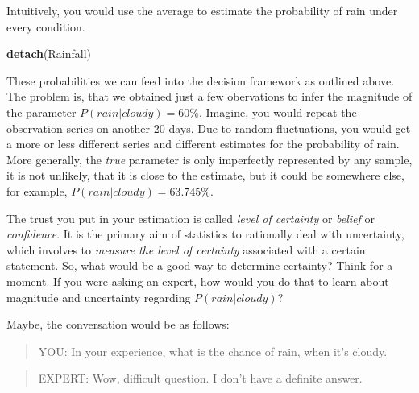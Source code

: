 \documentclass[]{svmono}
\newenvironment{Shaded}{\begin{snugshade}}{\end{snugshade}}
\newcommand{\KeywordTok}[1]{\textcolor[rgb]{0.13,0.29,0.53}{\textbf{#1}}}
\newcommand{\DataTypeTok}[1]{\textcolor[rgb]{0.13,0.29,0.53}{#1}}
\newcommand{\StringTok}[1]{\textcolor[rgb]{0.31,0.60,0.02}{#1}}
\newcommand{\OperatorTok}[1]{\textcolor[rgb]{0.81,0.36,0.00}{\textbf{#1}}}
\newcommand{\NormalTok}[1]{#1}
\theoremstyle{definition}
\theoremstyle{definition}
\theoremstyle{definition}
\theoremstyle{remark}
\begin{document}
Intuitively, you would use the average to estimate the probability of
rain under every condition.

\begin{Shaded}
\end{Shaded}

\begin{Shaded}
\begin{Highlighting}[]
\KeywordTok{detach}\NormalTok{(Rainfall)}
\end{Highlighting}
\end{Shaded}

These probabilities we can feed into the decision framework as outlined
above. The problem is, that we obtained just a few obervations to infer
the magnitude of the parameter \(P(rain|cloudy) = 60\)\%. Imagine, you
would repeat the observation series on another 20 days. Due to random
fluctuations, you would get a more or less different series and
different estimates for the probability of rain. More generally, the
\emph{true} parameter is only imperfectly represented by any sample, it
is not unlikely, that it is close to the estimate, but it could be
somewhere else, for example, \(P(rain|cloudy) = 63.745\)\%.

The trust you put in your estimation is called \emph{level of certainty}
or \emph{belief} or \emph{confidence}. It is the primary aim of
statistics to rationally deal with uncertainty, which involves to
\emph{measure the level of certainty} associated with a certain
statement. So, what would be a good way to determine certainty? Think
for a moment. If you were asking an expert, how would you do that to
learn about magnitude and uncertainty regarding \(P(rain|cloudy)\)?

Maybe, the conversation would be as follows:

\begin{quote}
YOU: In your experience, what is the chance of rain, when it's cloudy.
\end{quote}

\begin{quote}
EXPERT: Wow, difficult question. I don't have a definite answer.
\end{quote}
\end{document}
